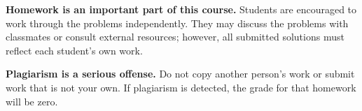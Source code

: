 \documentclass[UTF8]{ctexart}
\begin{document}
\noindent
\textbf{Homework is an important part of this course.} Students are encouraged to work through the problems independently. They may discuss the problems with classmates or consult external resources; however, all submitted solutions must reflect each student's own work.

\noindent
\textbf{Plagiarism is a serious offense.} Do not copy another person's work or submit work that is not your own. If plagiarism is detected, the grade for that homework will be zero.
\end{document}
